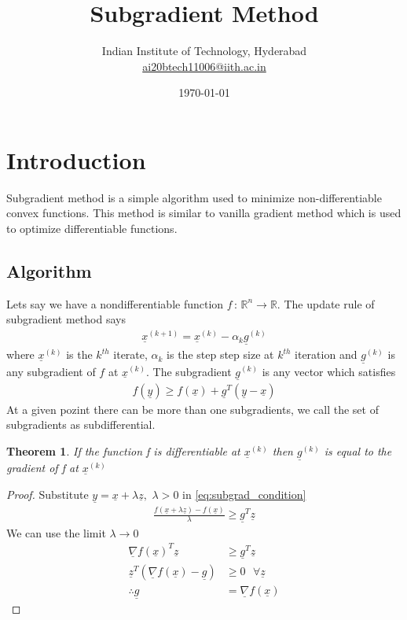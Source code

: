 \documentclass[twoside,twocolumn]{article}
\title{Subgradient Method} %
\author{%
\normalsize Indian Institute of Technology, Hyderabad \\ %
\normalsize \href{mailto:ai20btech11006@iith.ac.in}{ai20btech11006@iith.ac.in} %
}
\date{\today} %
\newtheorem{theorem}{Theorem}[section]
\renewcommand{\vec}[1]{\underline{#1}}
\newcommand\twospace{\,\,}
\newcommand\fourspace{\,\,\,\,}
\begin{document}
\maketitle

\section{Introduction}
Subgradient method is a simple algorithm used to minimize non-differentiable convex functions. This method is similar to vanilla gradient method which is used to optimize differentiable functions. 

\subsection{Algorithm}
Lets say we have a nondifferentiable function $f\, : \, \mathbb{R}^n\to \mathbb{R}$. The update rule of subgradient method says
\begin{align}
    \vec{x}^{(k+1)} = \vec{x}^{(k)} - \alpha_k\vec{g}^{(k)} \label{eq:subgrad_iter}
\end{align}
where $\vec{x}^{(k)}$ is the $k^{th}$ iterate, $\alpha_k$ is the step step size at $k^{th}$ iteration and $\vec{g}^{(k)}$ is any subgradient of $f$ at $\vec{x}^{(k)}$. The subgradient $\vec{g}^{(k)}$ is any vector which satisfies
\begin{align}
    f(\vec{y}) \geq f(\vec{x}) + \vec{g}^T(\vec{y}-\vec{x})\label{eq:subgrad_condition}
\end{align}
At a given pozint there can be more than one subgradients, we call the set of subgradients as subdifferential.
\begin{theorem}
    If the function f is differentiable at $\vec{x}^{(k)}$ then $\vec{g}^{(k)}$ is equal to the gradient of f at $\vec{x}^{(k)}$
\end{theorem}
\begin{proof}
    Substitute $\vec{y} = \vec{x}+\lambda\vec{z},\twospace \lambda > 0$ in \eqref{eq:subgrad_condition}
    \begin{align}
        \frac{f(\vec{x}+\lambda\vec{z}) - f(\vec{x})}{\lambda} \geq \vec{g}^T\vec{z}
    \end{align}
    We can use the limit $\lambda \to 0$
    \begin{align}
        \vec{\nabla}f(\vec{x})^T\vec{z} &\geq \vec{g}^T\vec{z}\\
        \vec{z}^T\left(\vec{\nabla}f(\vec{x})-\vec{g}\right) &\geq 0 \fourspace \forall \vec{z}\\
        \therefore \vec{g} & = \vec{\nabla}f(\vec{x})
    \end{align}
\end{proof}
\end{document}
